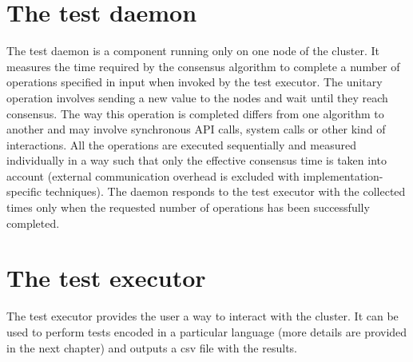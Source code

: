 \section{The test daemon} \label{test_daemon}
The test daemon is a component running only on one node of the cluster. It measures the time required by the consensus algorithm to complete a number of operations specified in input when invoked by the test executor. The unitary operation involves sending a new value to the nodes and wait until they reach consensus. The way this operation is completed differs from one algorithm to another and may involve synchronous API calls, system calls or other kind of interactions. All the operations are executed sequentially and measured individually in a way such that only the effective consensus time is taken into account (external communication overhead is excluded with implementation-specific techniques). The daemon responds to the test executor with the collected times only when the requested number of operations has been successfully completed. 

\section{The test executor}
The test executor provides the user a way to interact with the cluster. It can be used to perform tests encoded in a particular language (more details are provided in the next chapter) and outputs a csv file with the results. 